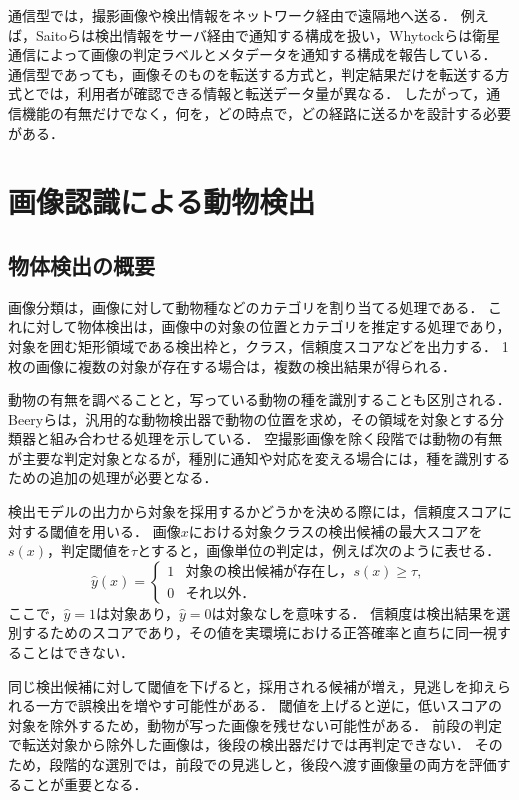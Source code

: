 通信型では，撮影画像や検出情報をネットワーク経由で遠隔地へ送る．
例えば，Saitoらは検出情報をサーバ経由で通知する構成を扱い\cite{IEICE2020}，Whytockらは衛星通信によって画像の判定ラベルとメタデータを通知する構成を報告している\cite{Whytock2023}．
通信型であっても，画像そのものを転送する方式と，判定結果だけを転送する方式とでは，利用者が確認できる情報と転送データ量が異なる．
したがって，通信機能の有無だけでなく，何を，どの時点で，どの経路に送るかを設計する必要がある．

\section{画像認識による動物検出}
\label{sec:background-detection}
\subsection{物体検出の概要}
画像分類は，画像に対して動物種などのカテゴリを割り当てる処理である．
これに対して物体検出は，画像中の対象の位置とカテゴリを推定する処理であり，対象を囲む矩形領域である検出枠と，クラス，信頼度スコアなどを出力する．
1枚の画像に複数の対象が存在する場合は，複数の検出結果が得られる．

動物の有無を調べることと，写っている動物の種を識別することも区別される．
Beeryらは，汎用的な動物検出器で動物の位置を求め，その領域を対象とする分類器と組み合わせる処理を示している\cite{Beery2019}．
空撮影画像を除く段階では動物の有無が主要な判定対象となるが，種別に通知や対応を変える場合には，種を識別するための追加の処理が必要となる．

検出モデルの出力から対象を採用するかどうかを決める際には，信頼度スコアに対する閾値を用いる．
画像$x$における対象クラスの検出候補の最大スコアを$s(x)$，判定閾値を$\tau$とすると，画像単位の判定は，例えば次のように表せる．
\begin{equation}
  \hat{y}(x)=
  \begin{cases}
    1 & \text{対象の検出候補が存在し，}s(x)\geq\tau,\\
    0 & \text{それ以外．}
  \end{cases}
  \label{eq:background-threshold}
\end{equation}
ここで，$\hat{y}=1$は対象あり，$\hat{y}=0$は対象なしを意味する．
信頼度は検出結果を選別するためのスコアであり，その値を実環境における正答確率と直ちに同一視することはできない．

同じ検出候補に対して閾値を下げると，採用される候補が増え，見逃しを抑えられる一方で誤検出を増やす可能性がある．
閾値を上げると逆に，低いスコアの対象を除外するため，動物が写った画像を残せない可能性がある．
前段の判定で転送対象から除外した画像は，後段の検出器だけでは再判定できない．
そのため，段階的な選別では，前段での見逃しと，後段へ渡す画像量の両方を評価することが重要となる．

